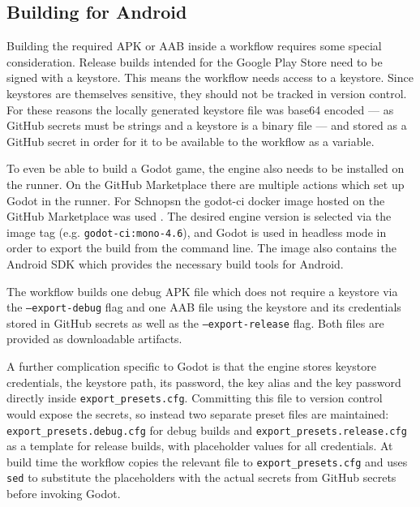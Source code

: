 \subsection{Building for Android}

Building the required APK or AAB inside a workflow requires some special consideration. Release builds intended for the Google Play Store need to be signed with a keystore. This means the workflow needs access to a keystore. Since keystores are themselves sensitive, they should not be tracked in version control. For these reasons the locally generated keystore file was base64 encoded — as GitHub secrets must be strings and a keystore is a binary file — and stored as a GitHub secret in order for it to be available to the workflow as a variable.

To even be able to build a Godot game, the engine also needs to be installed on the runner. On the GitHub Marketplace there are multiple actions which set up Godot in the runner. For Schnopsn the godot-ci docker image hosted on the GitHub Marketplace was used \cite{b12}. The desired engine version is selected via the image tag (e.g. \texttt{godot-ci:mono-4.6}), and Godot is used in headless mode in order to export the build from the command line. The image also contains the Android SDK which provides the necessary build tools for Android.

The workflow builds one debug APK file which does not require a keystore via the \texttt{--export-debug} flag and one AAB file using the keystore and its credentials stored in GitHub secrets as well as the \texttt{--export-release} flag. Both files are provided as downloadable artifacts.

A further complication specific to Godot is that the engine stores keystore credentials, the keystore path, its password, the key alias and the key password directly inside \texttt{export\_presets.cfg}. Committing this file to version control would expose the secrets, so instead two separate preset files are maintained: \texttt{export\_presets.debug.cfg} for debug builds and \texttt{export\_presets.release.cfg} as a template for release builds, with placeholder values for all credentials. At build time the workflow copies the relevant file to \texttt{export\_presets.cfg} and uses \texttt{sed} to substitute the placeholders with the actual secrets from GitHub secrets before invoking Godot.

